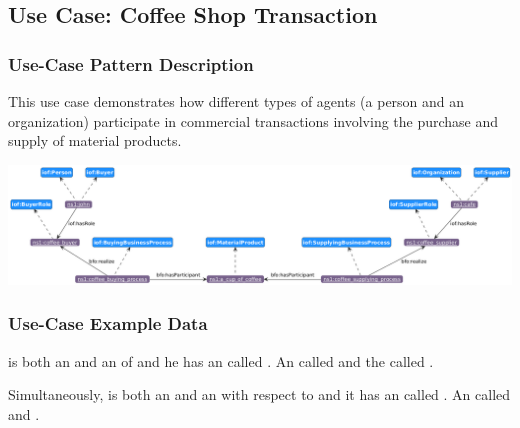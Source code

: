 \subsection*{Use Case: Coffee Shop Transaction}
\subsubsection*{Use-Case Pattern Description}
This use case demonstrates how different types of agents (a person and an organization) participate in commercial transactions involving the purchase and supply of material products.

\includegraphics[scale=0.35]{scenarios/different-type-agent/image/different-type-agent.png}

\subsubsection*{Use-Case Example Data}
 is both an  and an  of  and he has an  called .
An  called    and  the  called .


Simultaneously,  is both an  and an  with respect to  and it has an  called .
An  called    and  .


\begin{table}[h]
\label{tab:organization-structure}
\begin{tabular}{|l|l|}
\hline

\hline
\end{tabular}%
\end{table}


